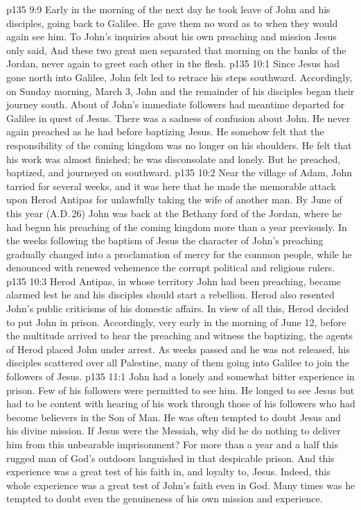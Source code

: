 \vs p135 9:9 \pc Early in the morning of the next day he took leave of John and his disciples, going back to Galilee. He gave them no word as to when they would again see him. To John’s inquiries about his own preaching and mission Jesus only said,  And these two great men separated that morning on the banks of the Jordan, never again to greet each other in the flesh.
\vs p135 10:1 Since Jesus had gone north into Galilee, John felt led to retrace his steps southward. Accordingly, on Sunday morning, March 3, John and the remainder of his disciples began their journey south. About  of John’s immediate followers had meantime departed for Galilee in quest of Jesus. There was a sadness of confusion about John. He never again preached as he had before baptizing Jesus. He somehow felt that the responsibility of the coming kingdom was no longer on his shoulders. He felt that his work was almost finished; he was disconsolate and lonely. But he preached, baptized, and journeyed on southward.
\vs p135 10:2 Near the village of Adam, John tarried for several weeks, and it was here that he made the memorable attack upon Herod Antipas for unlawfully taking the wife of another man. By June of this year (A.D.\,26) John was back at the Bethany ford of the Jordan, where he had begun his preaching of the coming kingdom more than a year previously. In the weeks following the baptism of Jesus the character of John’s preaching gradually changed into a proclamation of mercy for the common people, while he denounced with renewed vehemence the corrupt political and religious rulers.
\vs p135 10:3 Herod Antipas, in whose territory John had been preaching, became alarmed lest he and his disciples should start a rebellion. Herod also resented John’s public criticisms of his domestic affairs. In view of all this, Herod decided to put John in prison. Accordingly, very early in the morning of June 12, before the multitude arrived to hear the preaching and witness the baptizing, the agents of Herod placed John under arrest. As weeks passed and he was not released, his disciples scattered over all Palestine, many of them going into Galilee to join the followers of Jesus.
\vs p135 11:1 John had a lonely and somewhat bitter experience in prison. Few of his followers were permitted to see him. He longed to see Jesus but had to be content with hearing of his work through those of his followers who had become believers in the Son of Man. He was often tempted to doubt Jesus and his divine mission. If Jesus were the Messiah, why did he do nothing to deliver him from this unbearable imprisonment? For more than a year and a half this rugged man of God’s outdoors languished in that despicable prison. And this experience was a great test of his faith in, and loyalty to, Jesus. Indeed, this whole experience was a great test of John’s faith even in God. Many times was he tempted to doubt even the genuineness of his own mission and experience.
